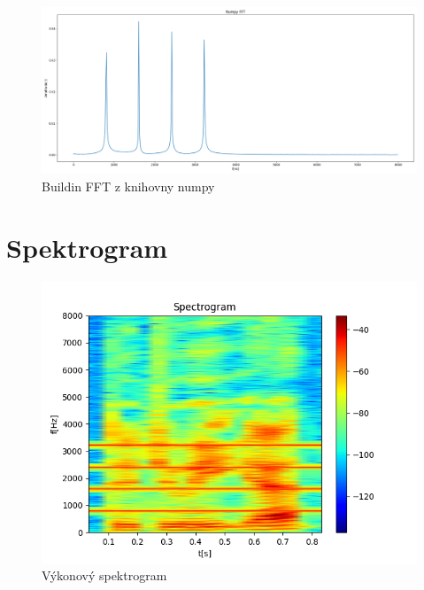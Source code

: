 \documentclass{article}
\begin{document}
\begin{landscape}
\begin{figure}[H] 
	\centering
	\includegraphics[scale=0.5,keepaspectratio]{Figure_4}
	\caption{Buildin FFT z knihovny numpy}
\end{figure}
\end{landscape}

\section{Spektrogram}
\begin{figure}[H] 
	\centering
	\includegraphics[scale=0.7,keepaspectratio]{Figure_6}
	\caption{Výkonový spektrogram}
\end{figure}
\end{document}

